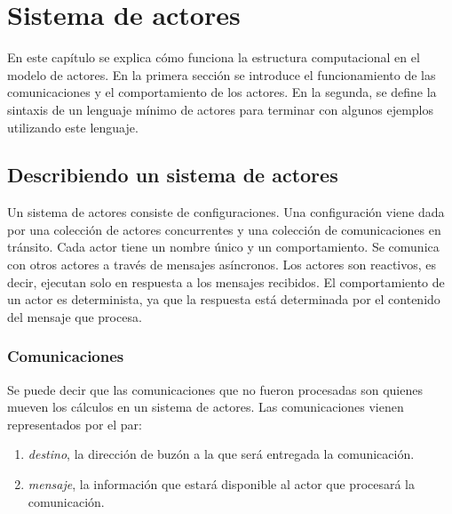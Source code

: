 \chapter{Sistema de actores}

\newcommand{\COMUNICACIONES}{\mathcal{K}}
\newcommand{\COMUNICACIONESSUB}{\mathsf{K}}

\newcommand{\COMUNICACION}{\bar{k}}
\newcommand{\BUZONES}{\mathcal{B}}
\newcommand{\BUZONESSUB}{\mathsf{B}}
\newcommand{\BUZON}{\beta}
\newcommand{\MENSAJES}{\mathcal{M}}
\newcommand{\MENSAJE}{m}

\newcommand{\ACTOR}{\alpha}
\newcommand{\COMPORTAMIENTOS}{\mathcal{C}}
\newcommand{\COMPORTAMIENTOSSUB}{\mathsf{C}}

\newcommand{\COMPORTAMIENTO}{c}
\newcommand{\COMNOPROC}{\kappa}

En este capítulo se explica cómo funciona la estructura computacional en el modelo de actores. En la primera sección se introduce el funcionamiento de las comunicaciones y el comportamiento de los actores. En la segunda, se define la sintaxis de un lenguaje mínimo de actores para terminar con algunos ejemplos utilizando este lenguaje.

\section{Describiendo un sistema de actores}
Un sistema de actores consiste de configuraciones. Una configuración viene dada por una colección de actores concurrentes y una colección de comunicaciones en tránsito. Cada actor tiene un nombre único y un comportamiento. Se comunica con otros actores a través de mensajes asíncronos. Los actores son reactivos, es decir, ejecutan solo en respuesta a los mensajes recibidos. El comportamiento de un actor es determinista, ya que la respuesta está determinada por el contenido del mensaje que procesa.

\subsection{Comunicaciones}

Se puede decir que las comunicaciones que no fueron procesadas son quienes mueven los cálculos en un sistema de actores. Las comunicaciones vienen representados por el par:

\begin{enumerate}
\item \textit{destino}, la dirección de buzón a la que será entregada la comunicación. 
\item \textit{mensaje}, la información que estará disponible al actor que procesará la comunicación.
\end{enumerate}

